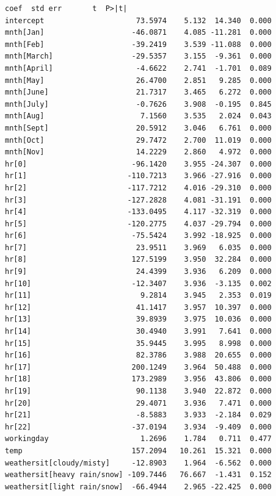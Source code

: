 \documentclass[11pt]{article}
\makeatletter
\newcommand{\boxspacing}{\kern\kvtcb@left@rule\kern\kvtcb@boxsep}
\newcommand{\prompt}[4]{
        {\ttfamily\llap{{\color{#2}[#3]:\hspace{3pt}#4}}\vspace{-\baselineskip}}
    }
\makeatother
\begin{document}
            \begin{tcolorbox}[breakable, size=fbox, boxrule=.5pt, pad at break*=1mm, opacityfill=0]
\prompt{Out}{outcolor}{68}{\boxspacing}
\begin{Verbatim}[commandchars=\\\{\}]
                                 coef  std err       t  P>|t|
intercept                     73.5974    5.132  14.340  0.000
mnth[Jan]                    -46.0871    4.085 -11.281  0.000
mnth[Feb]                    -39.2419    3.539 -11.088  0.000
mnth[March]                  -29.5357    3.155  -9.361  0.000
mnth[April]                   -4.6622    2.741  -1.701  0.089
mnth[May]                     26.4700    2.851   9.285  0.000
mnth[June]                    21.7317    3.465   6.272  0.000
mnth[July]                    -0.7626    3.908  -0.195  0.845
mnth[Aug]                      7.1560    3.535   2.024  0.043
mnth[Sept]                    20.5912    3.046   6.761  0.000
mnth[Oct]                     29.7472    2.700  11.019  0.000
mnth[Nov]                     14.2229    2.860   4.972  0.000
hr[0]                        -96.1420    3.955 -24.307  0.000
hr[1]                       -110.7213    3.966 -27.916  0.000
hr[2]                       -117.7212    4.016 -29.310  0.000
hr[3]                       -127.2828    4.081 -31.191  0.000
hr[4]                       -133.0495    4.117 -32.319  0.000
hr[5]                       -120.2775    4.037 -29.794  0.000
hr[6]                        -75.5424    3.992 -18.925  0.000
hr[7]                         23.9511    3.969   6.035  0.000
hr[8]                        127.5199    3.950  32.284  0.000
hr[9]                         24.4399    3.936   6.209  0.000
hr[10]                       -12.3407    3.936  -3.135  0.002
hr[11]                         9.2814    3.945   2.353  0.019
hr[12]                        41.1417    3.957  10.397  0.000
hr[13]                        39.8939    3.975  10.036  0.000
hr[14]                        30.4940    3.991   7.641  0.000
hr[15]                        35.9445    3.995   8.998  0.000
hr[16]                        82.3786    3.988  20.655  0.000
hr[17]                       200.1249    3.964  50.488  0.000
hr[18]                       173.2989    3.956  43.806  0.000
hr[19]                        90.1138    3.940  22.872  0.000
hr[20]                        29.4071    3.936   7.471  0.000
hr[21]                        -8.5883    3.933  -2.184  0.029
hr[22]                       -37.0194    3.934  -9.409  0.000
workingday                     1.2696    1.784   0.711  0.477
temp                         157.2094   10.261  15.321  0.000
weathersit[cloudy/misty]     -12.8903    1.964  -6.562  0.000
weathersit[heavy rain/snow] -109.7446   76.667  -1.431  0.152
weathersit[light rain/snow]  -66.4944    2.965 -22.425  0.000
\end{Verbatim}
\end{tcolorbox}
        
\end{document}
